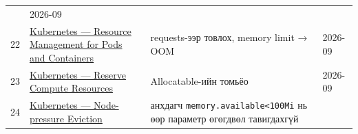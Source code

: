 \begin{longtable}[]{@{}llll@{}}
\begin{minipage}[t]{0.22\columnwidth}
\end{minipage} & \begin{minipage}[t]{0.22\columnwidth}\raggedright
2026-09\strut
\end{minipage}\tabularnewline
\begin{minipage}[t]{0.22\columnwidth}\raggedright
22\strut
\end{minipage} & \begin{minipage}[t]{0.22\columnwidth}\raggedright
\href{https://kubernetes.io/docs/concepts/configuration/manage-resources-containers/}{Kubernetes --- Resource Management for Pods and Containers}\strut
\end{minipage} & \begin{minipage}[t]{0.22\columnwidth}\raggedright
requests-ээр товлох, memory limit → OOM\strut
\end{minipage} & \begin{minipage}[t]{0.22\columnwidth}\raggedright
2026-09\strut
\end{minipage}\tabularnewline
\begin{minipage}[t]{0.22\columnwidth}\raggedright
23\strut
\end{minipage} & \begin{minipage}[t]{0.22\columnwidth}\raggedright
\href{https://kubernetes.io/docs/tasks/administer-cluster/reserve-compute-resources/}{Kubernetes --- Reserve Compute Resources}\strut
\end{minipage} & \begin{minipage}[t]{0.22\columnwidth}\raggedright
Allocatable-ийн томьёо\strut
\end{minipage} & \begin{minipage}[t]{0.22\columnwidth}\raggedright
2026-09\strut
\end{minipage}\tabularnewline
\begin{minipage}[t]{0.22\columnwidth}\raggedright
24\strut
\end{minipage} & \begin{minipage}[t]{0.22\columnwidth}\raggedright
\href{https://kubernetes.io/docs/concepts/scheduling-eviction/node-pressure-eviction/}{Kubernetes --- Node-pressure Eviction}\strut
\end{minipage} & \begin{minipage}[t]{0.22\columnwidth}\raggedright
анхдагч \texttt{memory.\allowbreak{}available\textless{}100Mi} нь өөр параметр өгөгдвөл тавигдахгүй\strut
\end{minipage} & \begin{minipage}[t]{0.22\columnwidth}\raggedright

\end{minipage}
\end{longtable}
